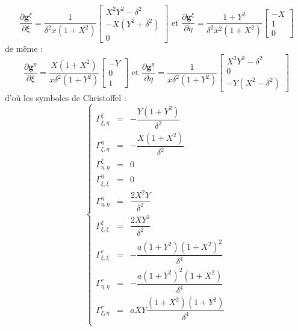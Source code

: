 \begin{equation}
\dfrac{\partial \mathbf{g}^{\xi}}{\partial \xi} = \dfrac{1}{\delta^2 x (1+X^2)} \begin{bmatrix}
X^2Y^2 - \delta^2 \\ -X(Y^2+\delta^2) \\ 0
\end{bmatrix}
\text{ et }
\dfrac{\partial \mathbf{g}^{\xi}}{\partial \eta} = \dfrac{1+Y^2}{\delta^2 x^2 (1+X^2)} \begin{bmatrix}
-X \\ 1 \\ 0
\end{bmatrix}
\end{equation}
de même :
\begin{equation}
\dfrac{\partial \mathbf{g}^{\eta}}{\partial \xi} = \dfrac{X(1+X^2)}{x \delta^2 (1+Y^2)} \begin{bmatrix}
-Y \\ 0 \\ 1
\end{bmatrix}
\text{ et }
\dfrac{\partial \mathbf{g}^{\eta}}{\partial \eta} = \dfrac{1}{x \delta^2 (1+Y^2)} \begin{bmatrix}
X^2 Y^2 - \delta^2 \\ 0 \\ -Y(X^2 - \delta^2)
\end{bmatrix}
\end{equation}
d'où les symboles de Christoffel :
\begin{equation}
\left\lbrace
\begin{array}{rcl}
\Gamma_{\xi,\eta}^{\xi} & = & - \dfrac{Y ( 1+Y^2)}{\delta^2}\\
\Gamma_{\xi,\eta}^{\eta} & = & - \dfrac{X(1+X^2)}{\delta^2}\\
\Gamma_{\eta,\eta}^{\xi} & = & 0 \\
\Gamma_{\xi,\xi}^{\eta} & = & 0 \\
\Gamma_{\eta,\eta}^{\eta} & = & \dfrac{2 X^2 Y}{\delta^2}\\
\Gamma_{\xi,\xi}^{\xi} & = & \dfrac{2 X Y^2}{\delta^2}\\
\Gamma_{\xi,\xi}^{r} & = & - \dfrac{a (1+Y^2)(1+X^2)^2}{\delta^4}\\
\Gamma_{\eta,\eta}^{r} & = & - \dfrac{a (1+Y^2)^2(1+X^2)}{\delta^4} \\
\Gamma_{\xi,\eta}^r & = & a XY \dfrac{(1+X^2)(1+Y^2)}{\delta^4}\\
\end{array}
\right.
\end{equation}

